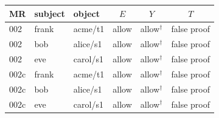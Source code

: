 \begin{tabular}{lllccc}
\toprule
MR & subject & object & $E$ & $Y$ & $T$ \\
\midrule
002 & frank & acme/t1 & allow & allow$^{\dagger}$ & false proof \\
002 & bob & alice/s1 & allow & allow$^{\dagger}$ & false proof \\
002 & eve & carol/s1 & allow & allow$^{\dagger}$ & false proof \\
002c & frank & acme/t1 & allow & allow$^{\dagger}$ & false proof \\
002c & bob & alice/s1 & allow & allow$^{\dagger}$ & false proof \\
002c & eve & carol/s1 & allow & allow$^{\dagger}$ & false proof \\
\bottomrule
\end{tabular}
